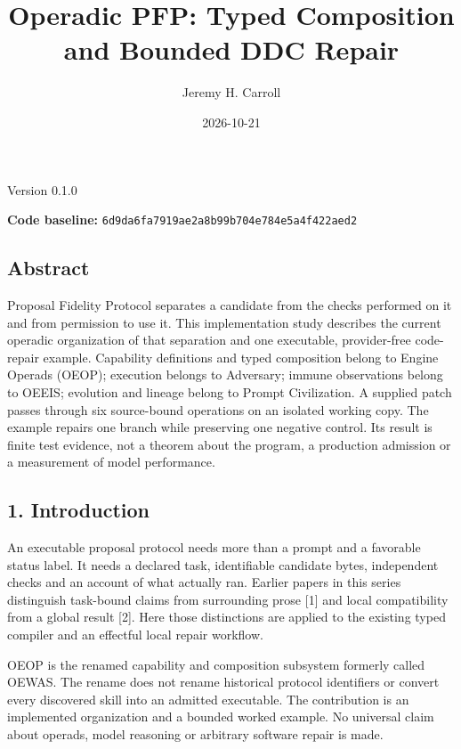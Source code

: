 \documentclass[
  11pt,
]{article}
\title{Operadic PFP: Typed Composition and Bounded DDC Repair}
\author{Jeremy H. Carroll}
\date{2026-10-21}
\begin{document}
\makeatletter
\begin{center}
{\LARGE \@title\par}
\vspace{0.8em}
{\normalsize \@author\par}
\vspace{0.5em}
{\small \@date\par}
{\small Version 0.1.0\par}
\end{center}
\makeatother

\textbf{Code baseline:}
\nolinkurl{6d9da6fa7919ae2a8b99b704e784e5a4f422aed2}

\subsection{Abstract}\label{abstract}

Proposal Fidelity Protocol separates a candidate from the checks
performed on it and from permission to use it. This implementation study
describes the current operadic organization of that separation and one
executable, provider-free code-repair example. Capability definitions
and typed composition belong to Engine Operads (OEOP); execution
belongs to Adversary; immune observations belong to OEEIS; evolution and
lineage belong to Prompt Civilization. A supplied patch passes through
six source-bound operations on an isolated working copy. The example
repairs one branch while preserving one negative control. Its result is
finite test evidence, not a theorem about the program, a production
admission or a measurement of model performance.

\subsection{1. Introduction}\label{introduction}

An executable proposal protocol needs more than a prompt and a favorable
status label. It needs a declared task, identifiable candidate bytes,
independent checks and an account of what actually ran. Earlier papers
in this series distinguish task-bound claims from surrounding prose
{[}1{]} and local compatibility from a global result {[}2{]}. Here those
distinctions are applied to the existing typed compiler and an effectful
local repair workflow.

OEOP is the renamed capability and composition subsystem formerly called
OEWAS. The rename does not rename historical protocol identifiers or
convert every discovered skill into an admitted executable. The
contribution is an implemented organization and a bounded worked
example. No universal claim about operads, model reasoning or arbitrary
software repair is made.
\end{document}
